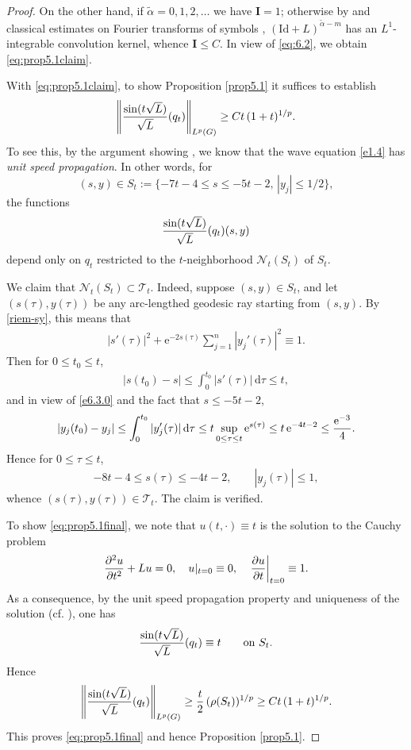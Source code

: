 \documentclass[10pt,a4paper]{amsart}
\newcommand{\e}{\mathrm{e}}
\newcommand{\Id}{\mathrm{Id}}
\renewcommand{\d}{\mathrm{d}}
\begin{document}
\begin{proof}
On the other hand, if $\widetilde{\alpha}=0,1,2,\dots$ we have $\mathbf I=1$; otherwise by \cite[Propositions 4.1, 5.2 and 5.7]{MuTh} and classical estimates on Fourier transforms of symbols \cite[p. 241]{St}, $(\Id+L)^{\widetilde{\alpha}-m}$ has an $L^1$-integrable convolution kernel, whence $\mathbf I\leq C$. In view of \eqref{eq:6.2}, we obtain \eqref{eq:prop5.1claim}.
\smallskip

With \eqref{eq:prop5.1claim}, to show Proposition \ref{prop5.1} it suffices to establish
\begin{align}\label{eq:prop5.1final}
\left\|{\sin(t\sqrt{L})\over\sqrt{L}}(q_t)\right\|_{L^p(G)}\geq Ct\,(1+t)^{1/p}.
\end{align}
To see this, by the argument showing \cite[Theorem 2.4.2]{Sog14}, we know that the wave equation \eqref{e1.4} has \textit{unit speed propagation}. In other words, for
$$
(s,y)\in S_t:=\{-7t-4\leq s\leq -5t-2,\, |y_j|\leq 1/2\},
$$
the functions
$$
{\sin(t\sqrt{L})\over\sqrt{L}}(q_t)(s,y)
$$
depend only on $q_t$ restricted to the $t$-neighborhood $\mathcal N_t(S_t)$ of $S_t$.

We claim that $\mathcal N_t(S_t) \subset \mathcal T_t$. Indeed, suppose $(s,y)\in S_t$, and let $(s(\tau),y(\tau))$ be any arc-lengthed geodesic ray starting from $(s,y)$. By \eqref{riem-sy}, this means that
\begin{align*}
|s'(\tau)|^2+\e^{-2s(\tau)}\sum_{j=1}^n|y_j'(\tau)|^2\equiv 1.
\end{align*}
Then for $0\leq t_0\leq t$,
\begin{align}\label{e6.3.0}
|s(t_0)-s|\leq \int_0^{t_0}|s'(\tau)|\,\d\tau\leq t,
\end{align}
and in view of \eqref{e6.3.0} and the fact that $s\leq -5t-2$,
\begin{align*}
|y_j(t_0)-y_j|\leq \int_0^{t_0} |y_j'(\tau)|\,\d \tau\leq t\sup_{0\leq\tau\leq t}\e^{s(\tau)}\leq t\,\e^{-4t-2}\leq {\e^{-3}\over 4}.
\end{align*}
Hence for $0\leq \tau\leq t$,
\begin{align*}
-8t-4\leq s(\tau)\leq -4t-2,\qquad |y_j(\tau)|\leq 1,
\end{align*}
whence $(s(\tau),y(\tau))\in \mathcal{T}_t$. The claim is verified.

To show \eqref{eq:prop5.1final}, we note that $u(t,\cdot)\equiv t$ is the solution to the Cauchy problem
\begin{align*}
{\partial^2u\over\partial t^2}+Lu=0,\quad u|_{t=0}\equiv 0,\quad\left.{\partial u\over\partial t}\right|_{t=0}\equiv1.
\end{align*}
As a consequence, by the unit speed propagation property and uniqueness of the solution (cf. \cite[pp. 12--13]{Sog14}), one has
\begin{align*}
{\sin(t\sqrt{L})\over \sqrt{L}}(q_t)\equiv t \qquad\text{on }S_t.
\end{align*}
Hence
\begin{align*}
\left\|{\sin(t\sqrt{L})\over \sqrt{L}}(q_t)\right\|_{L^p(G)}\geq {t\over 2}\,(\rho(S_t))^{1/p}\geq Ct\,(1+t)^{1/p}.
\end{align*}
This proves \eqref{eq:prop5.1final} and hence Proposition \ref{prop5.1}.
\end{proof}
\end{document}
